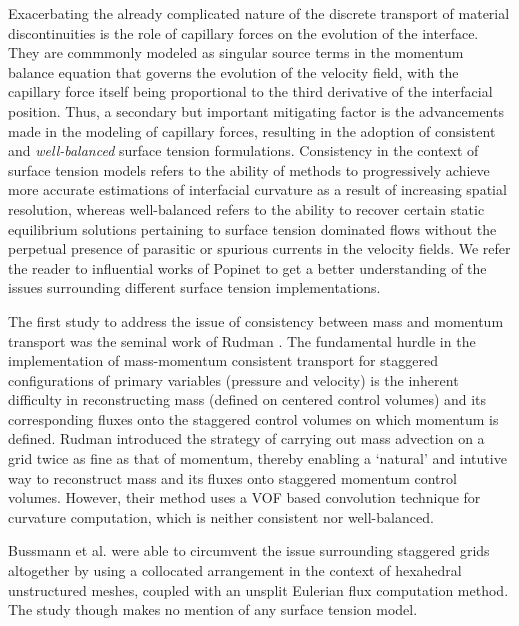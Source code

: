 Exacerbating the already complicated nature of the discrete transport of material 
discontinuities is the role of capillary forces on the evolution of the interface. 
They are commmonly modeled as singular source terms in the momentum balance equation that 
governs the evolution of the velocity field, with the capillary force itself 
being proportional to the third derivative of the interfacial position. 
Thus, a secondary but important mitigating factor is the advancements 
made in the modeling of capillary forces, resulting in the adoption of 
consistent and \textit{well-balanced} surface tension formulations.
Consistency in the context of surface tension models refers to the ability 
of methods to progressively achieve more accurate estimations of interfacial 
curvature as a result of increasing spatial resolution, 
whereas well-balanced refers to the ability to recover certain static 
equilibrium solutions pertaining to surface tension dominated flows 
without the perpetual presence of parasitic or spurious currents in the velocity fields.
We refer the reader to influential works of Popinet \cite{popinet2018numerical,popinet2009accurate}
to get a better understanding of the issues surrounding different surface tension implementations.  




The first study to address the issue of consistency between mass 
and momentum transport was the seminal work of Rudman .
The fundamental hurdle in the implementation of mass-momentum 
consistent transport for staggered configurations of primary variables 
(pressure and velocity) is the inherent difficulty in reconstructing mass 
(defined on centered control volumes) and its corresponding fluxes 
onto the staggered control volumes on which momentum is defined. 
Rudman introduced the strategy of carrying out mass advection 
on a grid twice as fine as that of momentum, 
thereby enabling a `natural' and intutive 
way to reconstruct mass and its fluxes onto staggered momentum control volumes. 
However, their method uses a VOF based convolution technique for curvature computation, 
which is neither consistent nor well-balanced.    


Bussmann et al.  were able to 
circumvent the issue surrounding staggered grids altogether 
by using a collocated arrangement in the context of hexahedral 
unstructured meshes, coupled with an unsplit Eulerian flux computation method.    
The study though makes no mention of any surface tension model. 



